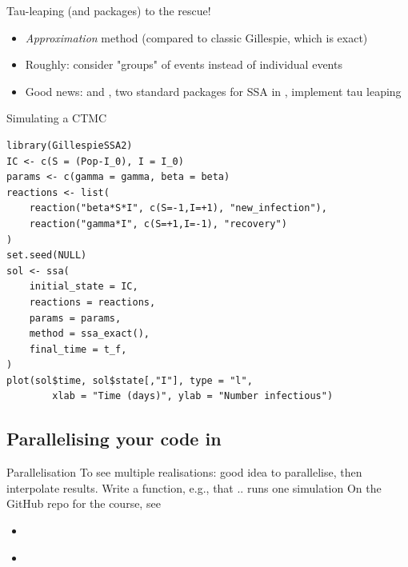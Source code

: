 \documentclass[aspectratio=43]{beamer}
\begin{document}
\begin{frame}{Tau-leaping (and packages) to the rescue!}
    \begin{itemize}
        \item \emph{Approximation} method (compared to classic Gillespie, which is exact)
        \item Roughly: consider "groups" of events instead of individual events
        \item Good news:  and , two standard packages for SSA in , implement tau leaping
    \end{itemize}
\end{frame}


\begin{frame}[fragile]{Simulating a CTMC}
\begin{lstlisting}[language=Renhanced]
library(GillespieSSA2)
IC <- c(S = (Pop-I_0), I = I_0)
params <- c(gamma = gamma, beta = beta)
reactions <- list(
    reaction("beta*S*I", c(S=-1,I=+1), "new_infection"),
    reaction("gamma*I", c(S=+1,I=-1), "recovery")
)
set.seed(NULL)
sol <- ssa(
    initial_state = IC,
    reactions = reactions,
    params = params,
    method = ssa_exact(),
    final_time = t_f,
)
plot(sol$time, sol$state[,"I"], type = "l",
        xlab = "Time (days)", ylab = "Number infectious")    
\end{lstlisting}
\end{frame}


\subsection{Parallelising your code in }

\begin{frame}{Parallelisation}
    To see multiple realisations: good idea to parallelise, then interpolate results. Write a function, e.g.,   that .. runs one simulation
    \vfill
    On the GitHub repo for the course, see
    \begin{itemize}
        \item \href{https://raw.githubusercontent.com/julien-arino/3MC-mathematical-modelling-in-biology/main/CODE/Julien/SIS_CTMC_parallel.R}{}
        \item \href{https://raw.githubusercontent.com/julien-arino/3MC-mathematical-modelling-in-biology/main/CODE/Julien/SIS_CTMC_parallel_multiple_R0.R}{}
    \end{itemize}
\end{frame}
\end{document}
